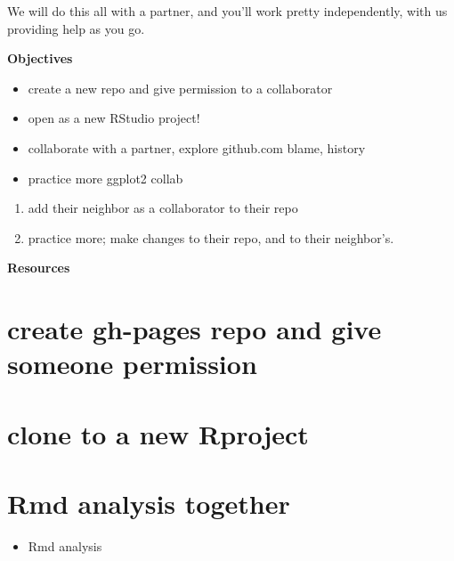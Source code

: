 \documentclass[]{book}
\providecommand{\tightlist}{%
  \setlength{\itemsep}{0pt}\setlength{\parskip}{0pt}}
\theoremstyle{definition}
\theoremstyle{definition}
\theoremstyle{definition}
\theoremstyle{remark}
\begin{document}
We will do this all with a partner, and you'll work pretty
independently, with us providing help as you go.

\textbf{Objectives}

\begin{itemize}
\tightlist
\item
  create a new repo and give permission to a collaborator
\item
  open as a new RStudio project!
\item
  collaborate with a partner, explore github.com blame, history
\item
  practice more ggplot2 collab
\end{itemize}

\begin{enumerate}
\def\labelenumi{\arabic{enumi}.}
\tightlist
\item
  add their neighbor as a collaborator to their repo
\item
  practice more; make changes to their repo, and to their neighbor's.
\end{enumerate}

\textbf{Resources}

\section{create gh-pages repo and give someone
permission}\label{create-gh-pages-repo-and-give-someone-permission}

\section{clone to a new Rproject}\label{clone-to-a-new-rproject}

\section{Rmd analysis together}\label{rmd-analysis-together}

\begin{itemize}
\tightlist
\item
  Rmd analysis
\end{itemize}
\end{document}
